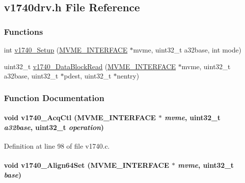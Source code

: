 \subsection{v1740drv.h File Reference}
\label{v1740drv_8h}
\subsubsection*{Functions}
\begin{DoxyCompactItemize}
\item 
int \hyperlink{v1740drv_8h_a023699754aec7c0d004358fffe10d4c2}{v1740\_\-Setup} (\hyperlink{structMVME__INTERFACE}{MVME\_\-INTERFACE} $\ast$mvme, uint32\_\-t a32base, int mode)
\item 
uint32\_\-t \hyperlink{v1740drv_8h_ac188fa4c584e5e969ee1d37592d0ba62}{v1740\_\-DataBlockRead} (\hyperlink{structMVME__INTERFACE}{MVME\_\-INTERFACE} $\ast$mvme, uint32\_\-t a32base, uint32\_\-t $\ast$pdest, uint32\_\-t $\ast$nentry)
\end{DoxyCompactItemize}


\subsubsection{Function Documentation}
\paragraph[{v1740\_\-AcqCtl}]{\setlength{\rightskip}{0pt plus 5cm}void v1740\_\-AcqCtl ({\bf MVME\_\-INTERFACE} $\ast$ {\em mvme}, \/  uint32\_\-t {\em a32base}, \/  uint32\_\-t {\em operation})}\hfill\label{v1740drv_8h_a68e89804f180e6ff440feeb59ff25ad4}


Definition at line 98 of file v1740.c.
\paragraph[{v1740\_\-Align64Set}]{\setlength{\rightskip}{0pt plus 5cm}void v1740\_\-Align64Set ({\bf MVME\_\-INTERFACE} $\ast$ {\em mvme}, \/  uint32\_\-t {\em base})}\hfill\label{v1740drv_8h_a009fe603a3ff4a4b9d0c31e2e8e4d129}
